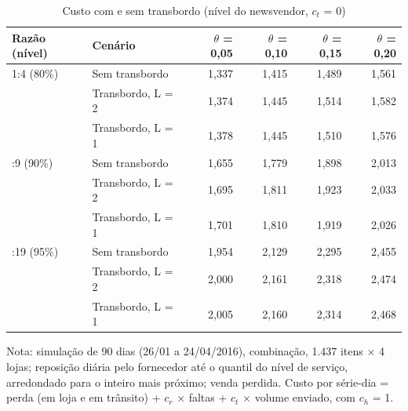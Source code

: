 \begin{table}[htbp]
\centering
\small
\caption{Custo com e sem transbordo (nível do newsvendor, $c_t$ = 0)}
\label{tab:tb_custo}
\begin{tabular}{llrrrr}
\toprule
Razão (nível) & Cenário & $\theta$ = 0,05 & $\theta$ = 0,10 & $\theta$ = 0,15 & $\theta$ = 0,20 \\
\midrule
1:4 (80\%) & Sem transbordo & 1,337 & 1,415 & 1,489 & 1,561 \\
 & Transbordo, L = 2 & 1,374 & 1,445 & 1,514 & 1,582 \\
 & Transbordo, L = 1 & 1,378 & 1,445 & 1,510 & 1,576 \\
\addlinespace
1:9 (90\%) & Sem transbordo & 1,655 & 1,779 & 1,898 & 2,013 \\
 & Transbordo, L = 2 & 1,695 & 1,811 & 1,923 & 2,033 \\
 & Transbordo, L = 1 & 1,701 & 1,810 & 1,919 & 2,026 \\
\addlinespace
1:19 (95\%) & Sem transbordo & 1,954 & 2,129 & 2,295 & 2,455 \\
 & Transbordo, L = 2 & 2,000 & 2,161 & 2,318 & 2,474 \\
 & Transbordo, L = 1 & 2,005 & 2,160 & 2,314 & 2,468 \\
\bottomrule
\end{tabular}
\par\smallskip
{\footnotesize Nota: simulação de 90 dias (26/01 a 24/04/2016), combinação, 1.437 itens × 4 lojas; reposição diária pelo fornecedor até o quantil do nível de serviço, arredondado para o inteiro mais próximo; venda perdida. Custo por série-dia = perda (em loja e em trânsito) + $c_r$ × faltas + $c_t$ × volume enviado, com $c_h$ = 1.}
\end{table}
